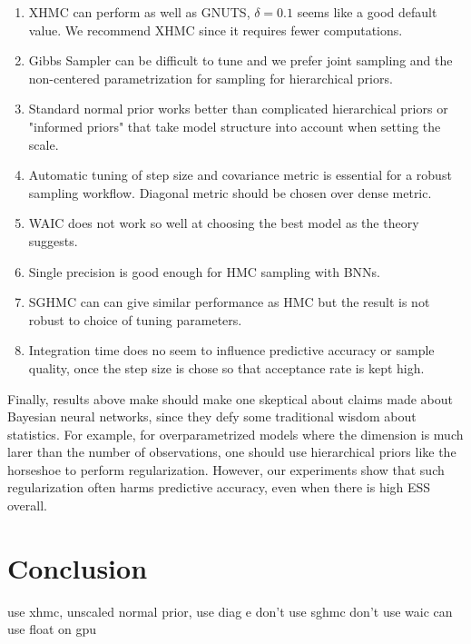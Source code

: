 \documentclass[12pt]{report}
\begin{document}
\begin{enumerate}
\item XHMC can perform as well as GNUTS, $\delta = 0.1$ seems like a good default value. We recommend XHMC since it requires fewer computations. 

\item Gibbs Sampler can be difficult to tune and we prefer joint sampling and the non-centered parametrization for sampling for hierarchical priors.

\item Standard normal prior works better than complicated hierarchical priors or "informed priors" that take model structure into account when setting the scale.

\item Automatic tuning of step size and covariance metric is essential for a robust sampling workflow. Diagonal metric should be chosen over dense metric.

\item WAIC does not work so well at choosing the best model as the theory suggests. 

\item Single precision is good enough for HMC sampling with BNNs. 

\item  SGHMC can can give similar performance as HMC but the result is not robust to choice of tuning parameters.

\item Integration time does no seem to influence predictive accuracy or sample quality, once the step size is chose so that acceptance rate is kept high.

\end{enumerate}

Finally, results above make should make one skeptical about claims made about Bayesian neural networks, since they defy some traditional wisdom about statistics. For example, for overparametrized models where the dimension is much larer than the number of observations, one should use hierarchical priors like the horseshoe to perform regularization. However, our experiments show that such regularization often harms predictive accuracy, even when there is high ESS overall.



\chapter{Conclusion}
use xhmc, unscaled normal prior, 
use diag e 
don't use sghmc
don't use waic 
can use float on gpu
\end{document}
